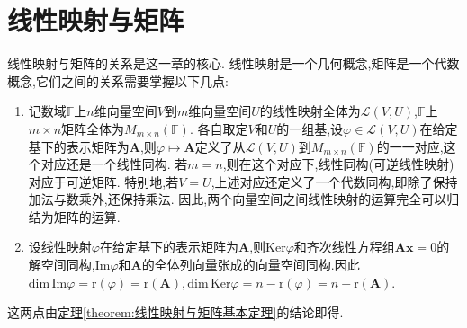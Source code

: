 \documentclass[lang=cn,newtx,10pt,scheme=chinese]{elegantbook}
\begin{document}
\section{线性映射与矩阵}

线性映射与矩阵的关系是这一章的核心. 线性映射是一个几何概念,矩阵是一个代数概念,它们之间的关系需要掌握以下几点:
\begin{enumerate}[(1)]
\item\label{线性映射与矩阵基本结论1} 记数域\(\mathbb{F}\)上\(n\)维向量空间\(V\)到\(m\)维向量空间\(U\)的线性映射全体为\(\mathcal{L}(V,U)\),\(\mathbb{F}\)上\(m\times n\)矩阵全体为\(M_{m\times n}(\mathbb{F})\). 各自取定\(V\)和\(U\)的一组基,设\(\varphi\in\mathcal{L}(V,U)\)在给定基下的表示矩阵为\(\boldsymbol{A}\),则\(\varphi\mapsto\boldsymbol{A}\)定义了从\(\mathcal{L}(V,U)\)到\(M_{m\times n}(\mathbb{F})\)的一一对应,这个对应还是一个线性同构. 若\(m = n\),则在这个对应下,线性同构(可逆线性映射)对应于可逆矩阵. 特别地,若\(V = U\),上述对应还定义了一个代数同构,即除了保持加法与数乘外,还保持乘法. 因此,两个向量空间之间线性映射的运算完全可以归结为矩阵的运算.

\item\label{线性映射与矩阵基本结论2} 设线性映射\(\varphi\)在给定基下的表示矩阵为\(\boldsymbol{A}\),则\(\text{Ker}\varphi\)和齐次线性方程组\(\boldsymbol{A}\boldsymbol{x}=0\)的解空间同构,\(\text{Im}\varphi\)和\(\boldsymbol{A}\)的全体列向量张成的向量空间同构.因此$\mathrm{dim}\,\mathrm{Im}\varphi =\mathrm{r}\left( \varphi \right) =\mathrm{r}\left( \boldsymbol{A} \right) ,\mathrm{dim}\,\mathrm{Ker}\varphi =n-\mathrm{r}\left( \varphi \right) =n-\mathrm{r}\left( \boldsymbol{A} \right)$.
\end{enumerate}
这两点由\hyperref[theorem:线性映射与矩阵基本定理]{定理\ref{theorem:线性映射与矩阵基本定理}}的结论即得.
\end{document}
